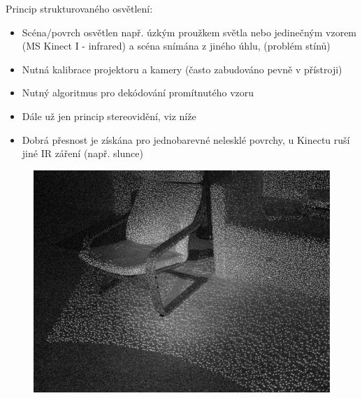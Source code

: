 \begin{frame}
Princip strukturovaného osvětlení:
\begin{itemize}
\item Scéna/povrch osvětlen např. úzkým proužkem světla nebo jedinečným vzorem (MS Kinect I - infrared) a scéna snímána z jiného úhlu,  (problém stínů)
\item Nutná kalibrace projektoru a kamery (často zabudováno pevně v přístroji)
\item Nutný algoritmus pro dekódování promítnutého vzoru
\item Dále už jen princip stereovidění, viz níže
\item Dobrá přesnost je získána pro jednobarevné nelesklé povrchy, u Kinectu ruší jiné IR záření (např. slunce)
\end{itemize}
    \begin{figure}[!ht]
	\centering
	\includegraphics[width = 1.0\textwidth]{./kinect1}
	\end{figure}
\end{frame}

